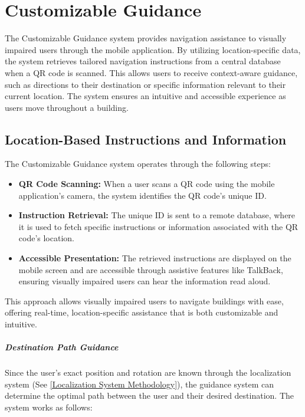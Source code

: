 \section{Customizable Guidance}

The Customizable Guidance system provides navigation assistance to visually impaired users through the mobile application. By utilizing location-specific data, the system retrieves tailored navigation instructions from a central database when a QR code is scanned. This allows users to receive context-aware guidance, such as directions to their destination or specific information relevant to their current location. The system ensures an intuitive and accessible experience as users move throughout a building.

\subsection{Location-Based Instructions and Information}

The Customizable Guidance system operates through the following steps:

\begin{itemize}
	\item \textbf{QR Code Scanning:} When a user scans a QR code using the mobile application's camera, the system identifies the QR code's unique ID.
	\item \textbf{Instruction Retrieval:} The unique ID is sent to a remote database, where it is used to fetch specific instructions or information associated with the QR code's location.
	\item \textbf{Accessible Presentation:} The retrieved instructions are displayed on the mobile screen and are accessible through assistive features like TalkBack, ensuring visually impaired users can hear the information read aloud.
\end{itemize}

This approach allows visually impaired users to navigate buildings with ease, offering real-time, location-specific assistance that is both customizable and intuitive.


\subparagraph{Destination Path Guidance}

Since the user's exact position and rotation are known through the localization system (See \ref{Localization System Methodology}), the guidance system can determine the optimal path between the user and their desired destination. The system works as follows:

